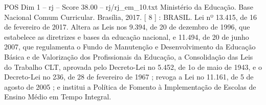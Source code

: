 \begin{textsample}{POS Dim 1 – rj – Score 38.00 – rj/rj\_em\_10.txt}
Ministério da Educação.
Base Nacional Comum Curricular.
Brasília, 2017. [ 8 ] : BRASIL.
Lei nº 13.415, de 16 de fevereiro de 2017.
Altera as Leis nos 9.394, de 20 de dezembro de 1996, que estabelece as diretrizes e bases da educação nacional, e 11.494, de 20 de junho 2007, que regulamenta o Fundo de Manutenção e Desenvolvimento da Educação Básica e de Valorização dos Profissionais da Educação, a Consolidação das Leis do Trabalho CLT, aprovada pelo Decreto-Lei no 5.452, de 1o de maio de 1943, e o Decreto-Lei no 236, de 28 de fevereiro de 1967 ; revoga a Lei no 11.161, de 5 de agosto de 2005 ; e institui a Política de Fomento à Implementação de Escolas de Ensino Médio em Tempo Integral.

\end{textsample}
